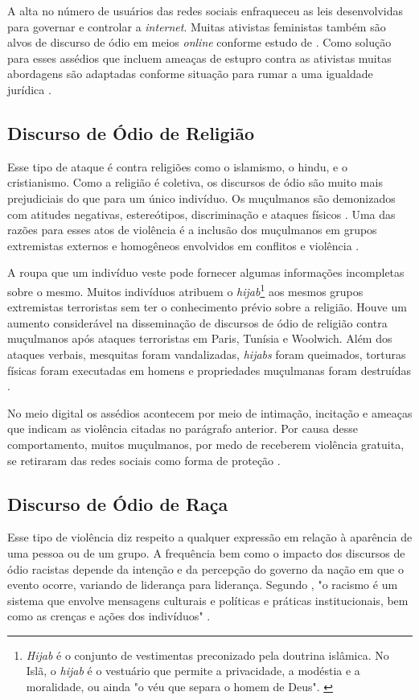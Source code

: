 A alta no número de usuários das redes sociais enfraqueceu as leis desenvolvidas para governar e controlar a \textit{internet}. Muitas ativistas feministas também são alvos de discurso de ódio em meios \textit{online} conforme estudo de 
. Como solução para esses assédios que incluem ameaças de estupro contra as ativistas muitas abordagens são adaptadas conforme situação para rumar a uma igualdade jurídica \cite{Levy2017}. 

\subsection{Discurso de Ódio de Religião}
Esse tipo de ataque é contra religiões como o islamismo, o hindu, e o cristianismo. Como a religião é coletiva, os discursos de ódio são muito mais prejudiciais do que para um único indivíduo. Os muçulmanos são demonizados com atitudes negativas, estereótipos, discriminação e ataques físicos \cite{Chetty2018}. Uma das razões para esses atos de violência é a inclusão dos muçulmanos em grupos extremistas externos e homogêneos envolvidos em conflitos e violência \cite{Trnberg2016}.  

A roupa que um indivíduo veste pode fornecer algumas informações incompletas sobre o mesmo. Muitos indivíduos atribuem o \textit{hijab}\footnote{\textit{Hijab} é o conjunto de vestimentas preconizado pela doutrina islâmica. No Islã, o \textit{hijab} é o vestuário que permite a privacidade, a modéstia e a moralidade, ou ainda "o véu que separa o homem de Deus". \cite{9780742562967}} aos mesmos grupos extremistas terroristas sem ter o conhecimento prévio sobre a religião. Houve um aumento considerável na disseminação de discursos de ódio de religião contra muçulmanos após ataques terroristas em Paris, Tunísia e Woolwich. Além dos ataques verbais, mesquitas foram vandalizadas, \textit{hijabs} foram queimados, torturas físicas foram executadas em homens e propriedades muçulmanas foram destruídas \cite{Awan2016,Chetty2018}.

No meio digital os assédios acontecem por meio de intimação, incitação e ameaças que indicam as violência citadas no parágrafo anterior. Por causa desse comportamento, muitos muçulmanos, por medo de receberem violência gratuita, se retiraram das redes sociais como forma de proteção \cite{Chetty2018}.

\subsection{Discurso de Ódio de Raça}
Esse tipo de violência diz respeito a qualquer expressão em relação à aparência de uma pessoa ou de um grupo. A frequência bem como o impacto dos discursos de ódio racistas depende da intenção e da percepção do governo da nação em que o evento ocorre, variando de liderança para liderança. Segundo , "o racismo é um sistema que envolve mensagens culturais e políticas e práticas institucionais, bem como as crenças e ações dos indivíduos" \cite{tatum2001defining}.

